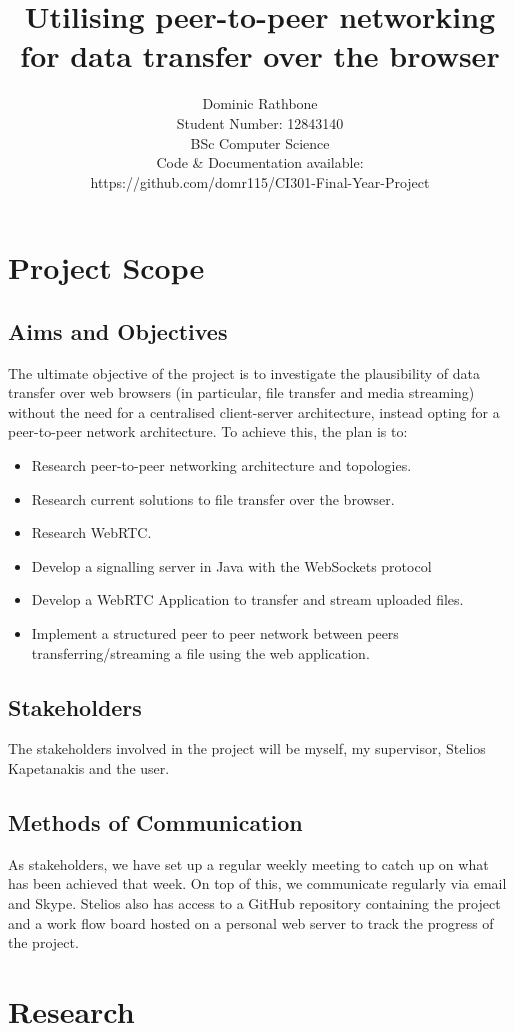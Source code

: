 \documentclass[]{report}
\title{Utilising peer-to-peer networking for data transfer over the browser}
\author{
	 Dominic Rathbone
	 \\ Student Number: 12843140 
	 \\ BSc Computer Science 
	 \\ Code \& Documentation available: 
	 \\	https://github.com/domr115/CI301-Final-Year-Project 
}
\begin{document}
\maketitle
\tableofcontents

\chapter{Project Scope}
\section{Aims and Objectives}
	The ultimate objective of the project is to investigate the plausibility of data transfer over web browsers (in particular, file transfer and media streaming) without the need for a centralised client-server architecture, instead opting for a peer-to-peer network architecture. To achieve this, the plan is to:
	\begin{itemize}
		\item Research peer-to-peer networking architecture and topologies.
		\item Research current solutions to file transfer over the browser.
		\item Research WebRTC.
		\item Develop a signalling server in Java with the WebSockets protocol
		\item Develop a WebRTC Application to transfer and stream uploaded files.
		\item Implement a structured peer to peer network between peers transferring/streaming a file using the web application.
	\end{itemize}
\section{Stakeholders}
	The stakeholders involved in the project will be myself, my supervisor, Stelios Kapetanakis and the user.
\section{Methods of Communication}
	As stakeholders, we have set up a regular weekly meeting to catch up on what has been achieved that week. On top of this, we communicate regularly via email and Skype. Stelios also has access to a GitHub repository containing the project and a work flow board hosted on a personal web server to track the progress of the project. 
	
\chapter{Research}
	
\end{document}
